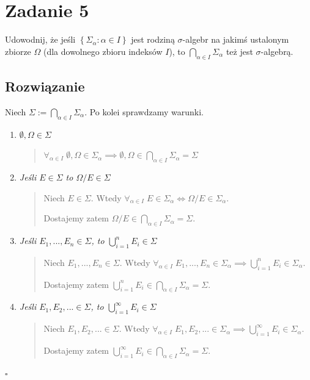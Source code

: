 \section{Zadanie 5}
Udowodnij, że jeśli \(\left\{ \Sigma_\alpha : \alpha \in I \right\}\) jest rodziną \(\sigma\)-algebr na jakimś ustalonym zbiorze \(\Omega\) (dla dowolnego zbioru indeksów \(I\)), to \(\bigcap_{\alpha \in I} \Sigma_\alpha\) też jest \(\sigma\)-algebrą.

\subsection*{Rozwiązanie}
Niech \(\Sigma := \bigcap_{\alpha \in I} \Sigma_\alpha\). Po kolei sprawdzamy warunki.
\begin{enumerate}
	\item \textit{\(\emptyset, \Omega \in \Sigma\)}
	      \begin{quote}
		      \(\forall_{\alpha \in I} \; \emptyset, \Omega \in \Sigma_\alpha \implies \emptyset, \Omega \in \bigcap_{\alpha \in I} \Sigma_\alpha = \Sigma\)
	      \end{quote}
	\item \textit{Jeśli \(E \in \Sigma\) to \(\Omega/E \in \Sigma\)}
	      \begin{quote}
		      Niech \(E \in \Sigma\). Wtedy \(\forall_{\alpha \in I} \; E \in \Sigma_\alpha \iff \Omega / E \in \Sigma_\alpha\).

		      Dostajemy zatem \(\Omega/E \in \bigcap_{\alpha \in I} \Sigma_\alpha = \Sigma\).
	      \end{quote}
	\item \textit{Jeśli \(E_1, ..., E_n \in \Sigma\), to \(\bigcup_{i=1}^n E_i \in \Sigma\)}
	      \begin{quote}
		      Niech \(E_1, ..., E_n \in \Sigma\). Wtedy \(\forall_{\alpha \in I} \; E_1, ..., E_n \in \Sigma_\alpha \implies \bigcup_{i=1}^n E_i \in \Sigma_\alpha\).

		      Dostajemy zatem \(\bigcup_{i=1}^n E_i \in \bigcap_{\alpha \in I} \Sigma_\alpha = \Sigma\).
	      \end{quote}
	\item \textit{Jeśli \(E_1, E_2, ... \in \Sigma\), to \(\bigcup_{i=1}^\infty E_i \in \Sigma\)}
	      \begin{quote}
		      Niech \(E_1, E_2, ... \in \Sigma\). Wtedy \(\forall_{\alpha \in I} \; E_1, E_2, ... \in \Sigma_\alpha \implies \bigcup_{i=1}^\infty E_i \in \Sigma_\alpha\).

		      Dostajemy zatem \(\bigcup_{i=1}^\infty E_i \in \bigcap_{\alpha \in I} \Sigma_\alpha = \Sigma\).
	      \end{quote}
\end{enumerate}
\(\square\)
